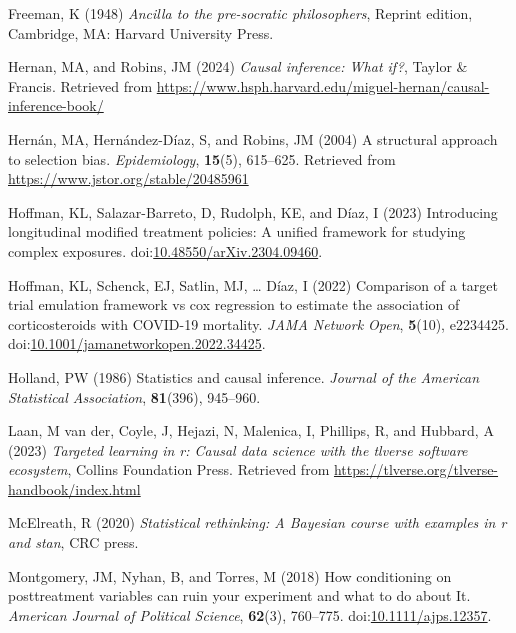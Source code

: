 \documentclass[
  single column]{article}
\newlength{\cslhangindent}
\newenvironment{CSLReferences}[2] %
 {\begin{list}{}{%
  \setlength{\itemindent}{0pt}
  \setlength{\leftmargin}{0pt}
  \setlength{\parsep}{0pt}
  \ifodd #1
   \setlength{\leftmargin}{\cslhangindent}
   \setlength{\itemindent}{-1\cslhangindent}
  \fi
  \setlength{\itemsep}{#2\baselineskip}}}
 {\end{list}}
\begin{document}
\begin{CSLReferences}{1}{0}
Freeman, K (1948) \emph{Ancilla to the pre-socratic philosophers},
Reprint edition, Cambridge, MA: Harvard University Press.

Hernan, MA, and Robins, JM (2024) \emph{Causal inference: What if?},
Taylor \& Francis. Retrieved from
\url{https://www.hsph.harvard.edu/miguel-hernan/causal-inference-book/}

Hernán, MA, Hernández-Díaz, S, and Robins, JM (2004) A structural
approach to selection bias. \emph{Epidemiology}, \textbf{15}(5),
615--625. Retrieved from \url{https://www.jstor.org/stable/20485961}

Hoffman, KL, Salazar-Barreto, D, Rudolph, KE, and Díaz, I (2023)
Introducing longitudinal modified treatment policies: A unified
framework for studying complex exposures.
doi:\href{https://doi.org/10.48550/arXiv.2304.09460}{10.48550/arXiv.2304.09460}.

Hoffman, KL, Schenck, EJ, Satlin, MJ, \ldots{} Díaz, I (2022) Comparison
of a target trial emulation framework vs cox regression to estimate the
association of corticosteroids with COVID-19 mortality. \emph{JAMA
Network Open}, \textbf{5}(10), e2234425.
doi:\href{https://doi.org/10.1001/jamanetworkopen.2022.34425}{10.1001/jamanetworkopen.2022.34425}.

Holland, PW (1986) Statistics and causal inference. \emph{Journal of the
American Statistical Association}, \textbf{81}(396), 945--960.

Laan, M van der, Coyle, J, Hejazi, N, Malenica, I, Phillips, R, and
Hubbard, A (2023) \emph{Targeted learning in r: Causal data science with
the tlverse software ecosystem}, Collins Foundation Press. Retrieved
from \url{https://tlverse.org/tlverse-handbook/index.html}

McElreath, R (2020) \emph{Statistical rethinking: A {B}ayesian course
with examples in r and stan}, CRC press.

Montgomery, JM, Nyhan, B, and Torres, M (2018) How conditioning on
posttreatment variables can ruin your experiment and what to do about
It. \emph{American Journal of Political Science}, \textbf{62}(3),
760--775.
doi:\href{https://doi.org/10.1111/ajps.12357}{10.1111/ajps.12357}.


\end{CSLReferences}
\end{document}
